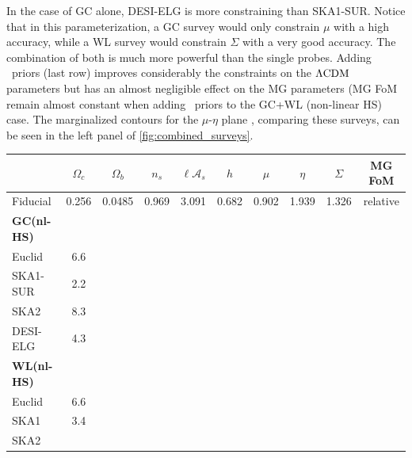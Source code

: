 \begin{table}[htbp]
{In the case of GC alone, DESI-ELG is more constraining than SKA1-SUR.
Notice that in this parameterization, a GC survey would only constrain $\mu$ with
a high accuracy, while a WL survey would constrain $\Sigma$ with
a very good accuracy. The combination of both is much more
powerful than the single probes. Adding \planck\ priors (last row) improves considerably the
constraints on the $\Lambda\mathrm{CDM}$ parameters but has an almost negligible effect on the MG parameters (MG FoM remain almost constant when adding \planck\ priors to the GC+WL (non-linear HS) case. The marginalized contours for the $\mu$-$\eta$ plane , comparing these surveys, can be seen in the left panel of \cref{fig:combined_surveys}.
}
\end{table}
\normalsize

\begin{table}[htbp]
\centering{}%
\footnotesize
\begin{tabular}{|l|c|c|c|c|c||c|c|c|c|}
\hline
	 & $\Omega_{c}$ & $\Omega_{b}$ & $n_{s}$ & $\ell\mathcal{A}_{s}$ & $h$ & $\mu$ & $\eta$ & $\Sigma$  & MG FoM \TBstrut\tabularnewline
\hline 
Fiducial & {0.256} & {0.0485} & {0.969} & {3.091} & {0.682} & {0.902} & {1.939} & {1.326} & relative \TBstrut\tabularnewline 
\hline 
\hline 
\textbf{GC(nl-HS)} &  &  &  &  &  &  &  & & \TBstrut\tabularnewline
Euclid   

& 6.6
\tabularnewline
SKA1-SUR  

& 2.2
\tabularnewline
SKA2  

& 8.3
\tabularnewline
DESI-ELG   

& 4.3
\tabularnewline
\hline 
\hline 
\textbf{WL(nl-HS)} &  &  &  &  &  &  &  &  & \TBstrut\tabularnewline
Euclid   

& 6.6
\tabularnewline
SKA1  

& 3.4
\tabularnewline
SKA2  


\end{tabular}
\end{table}
